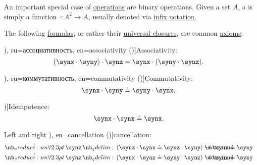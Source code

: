 \begin{definition}\label{def:binary_operation}
  An important special case of \hyperref[def:operation_on_set]{operations} are binary operations. Given a set \( A \), a  is simply a function \( \cdot: A^2 \to A \), usually denoted via \hyperref[rem:first_order_formula_conventions/infix]{infix notation}.

  The following \hyperref[def:first_order_syntax/formula]{formulas}, or rather their \hyperref[def:universal_closure]{universal closures}, are common \hyperref[def:first_order_theory/axiomatized]{axioms}:
  \begin{thmenum}
     \term[bg=асоциативност (\cite[11]{ГеновМиховскиМоллов1991Алгебра}), ru=ассоциативность, en=associativity (\cite[329]{Rosen2018DiscreteHandbook})]{Associativity}:
    \begin{equation}\label{eq:def:binary_operation/associative}
      (\synx \cdot \syny) \cdot \synz = \synx \cdot (\syny \cdot \synz).
    \end{equation}

     \term[bg=комутативност (\cite[11]{ГеновМиховскиМоллов1991Алгебра}), ru=коммутативность, en=commutativity (\cite[329]{Rosen2018DiscreteHandbook})]{Commutativity}:
    \begin{equation}\label{eq:def:binary_operation/commutative}
      \synx \cdot \syny \syneq \syny \cdot \synx.
    \end{equation}

     \term[ru=идемпотентность, en=idempotence (\cite[33]{Rosen2018DiscreteHandbook})]{Idempotence}:
    \begin{equation}\label{eq:def:binary_operation/idempotent}
      \synx \cdot \synx \syneq \synx.
    \end{equation}

     Left and right \term[ru=сокращение, bg=съкращаване (\cite[77]{ГеновМиховскиМоллов1991Алгебра}), en=cancellation (\cite[324]{Rosen2018DiscreteHandbook})]{cancellation}:
    \begin{align}
      \qforall \synz (\synz \cdot \synx \syneq \synz \cdot \syny) \synimplies \synx \syneq \syny
      \label{eq:def:binary_operation/cancellative/left}
      \\
      \qforall \synz (\synx \cdot \synz \syneq \syny \cdot \synz) \synimplies \synx \syneq \syny
      \label{eq:def:binary_operation/cancellative/right}
    \end{align}
  \end{thmenum}
\end{definition}

